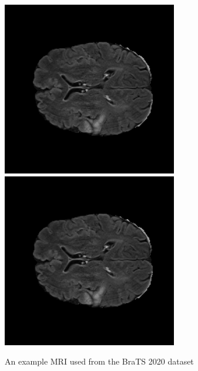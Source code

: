 \begin{figure}[!htbp]
  \begin{center}
    \leavevmode
    \ifpdf
      \includegraphics[height=3in]{Chapter3/Chapter3Figs/volume_12_slice_80.png}
    \else
      \includegraphics[bb = 92 86 545 742, height=3in]{Chapter3/Chapter3Figs/volume_12_slice_80.png}
    \fi
    \caption{An example MRI used from the BraTS 2020 dataset}
    \label{FigFmri}
  \end{center}
\end{figure}



